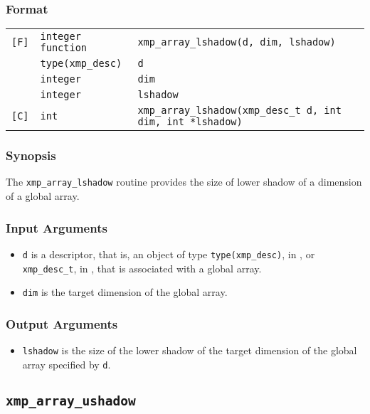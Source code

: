 \subsubsection*{Format}

\begin{tabular}{lll}

\verb![F]!& {\tt integer function}& {\tt xmp\_array\_lshadow(d, dim, lshadow)}\\
          & {\tt type(xmp\_desc)} & {\tt d}\\
          & {\tt integer} & {\tt dim}\\
          & {\tt integer} & {\tt lshadow}\\

\verb![C]!&  {\tt int}& {\tt xmp\_array\_lshadow(xmp\_desc\_t d, int dim, int *lshadow)}\\

\end{tabular}

\subsubsection*{Synopsis}

The {\tt xmp\_array\_lshadow} routine provides the size of lower shadow
of a dimension of a global array.


\subsubsection*{Input Arguments}
\begin{itemize}
 \item {\tt d} is a descriptor, that is, an object of type 
       {\tt type(xmp\_desc)}, in {\XMPF}, or {\tt xmp\_desc\_t},
       in {\XMPC}, that is associated with a global array.
 \item {\tt dim} is the target dimension of the global array.
\end{itemize}

\subsubsection*{Output Arguments}
\begin{itemize}
 \item {\tt lshadow} is the size of the lower shadow of the target
       dimension of the global array specified by {\tt d}.
\end{itemize}


\subsection{\tt xmp\_array\_ushadow}

